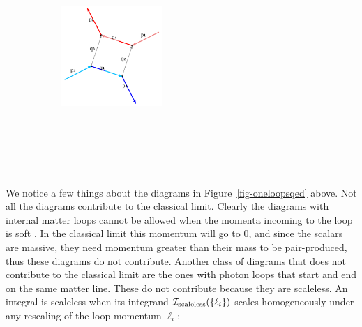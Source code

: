 \documentclass[
  11pt,
  a4paper,
  DIV=11,
  numbers=noendperiod,
  oneside]{scrreprt}
\DeclareRobustCommand{\[}{\begin{equation}}
\DeclareRobustCommand{\]}{\end{equation}}
\begin{document}
\begin{figure}
\begin{minipage}[t]{0.25\linewidth}
{\begin{figure}[H]
{}

\end{figure}

}

\end{minipage}%
\newline
\begin{minipage}[t]{0.25\linewidth}

{\centering 

\begin{figure}[H]

{\centering \includegraphics[width=1.5in,height=3.5in]{./scattering_files/figure-latex/dot-figure-10.png}

}

\end{figure}

}

\end{minipage}%

\end{figure}

We notice a few things about the diagrams in
Figure~\ref{fig-oneloopsqed} above. Not all the diagrams contribute to
the classical limit. Clearly the diagrams with internal matter loops
cannot be allowed when the momenta incoming to the loop is soft
. In the classical limit this momentum
will go to 0, and since the scalars are massive, they need momentum
greater than their mass to be pair-produced, thus these diagrams do not
contribute. Another class of diagrams that does not contribute to the
classical limit are the ones with photon loops that start and end on the
same matter line. These do not contribute because they are scaleless. An
integral is scaleless when its integrand
\(\mathcal{I}_\text{scaleless}(\{\ell_i \})\) scales homogeneously
under any rescaling of the loop momentum \(\ell_i\):
\end{document}
